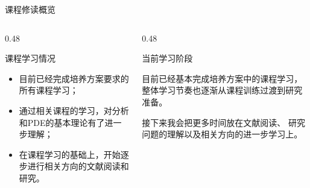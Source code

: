 \documentclass{beamer}
\begin{document}
\begin{frame}{课程修读概览}
\begin{columns}[T, onlytextwidth]
    \begin{column}{0.48\textwidth}
        \begin{block}{课程学习情况}
            \begin{minipage}[t][2.8cm][t]{\textwidth}
                \footnotesize
                \vspace{0.1em}
                \begin{itemize}
                    \setlength{\itemsep}{0.1em}
                    \item 目前已经完成培养方案要求的所有课程学习；
                    \item 通过相关课程的学习，对分析和PDE的基本理论有了进一步理解；
                    \item 在课程学习的基础上，开始逐步进行相关方向的文献阅读和研究。
                \end{itemize}
            \end{minipage}
        \end{block}
    \end{column}
    
    \begin{column}{0.48\textwidth}
        \begin{block}{当前学习阶段}
            \begin{minipage}[t][2.8cm][t]{\textwidth}
                \footnotesize
                \vspace{0.1em}
                目前已经基本完成培养方案中的课程学习，
                整体学习节奏也逐渐从课程训练过渡到研究准备。

                \vspace{0.5em}
                接下来我会把更多时间放在文献阅读、
                研究问题的理解以及相关方向的进一步学习上。
            \end{minipage}
        \end{block}
    \end{column}
    \end{columns}

\end{frame}
\end{document}
